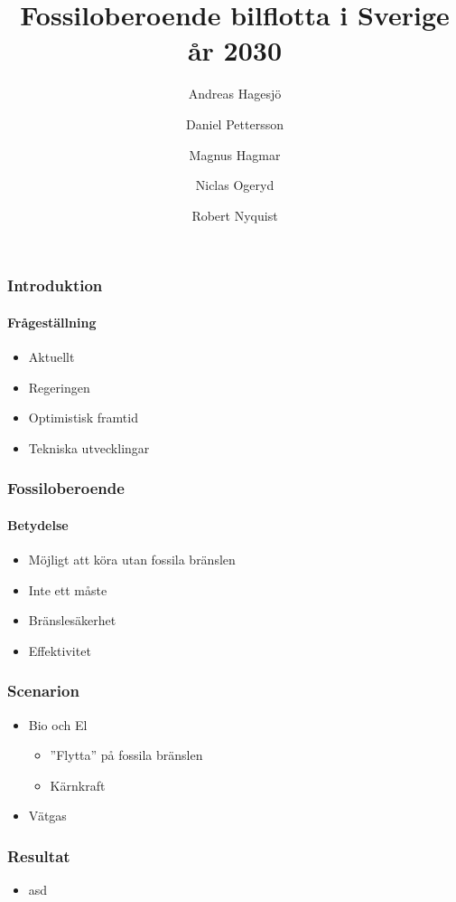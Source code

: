\documentclass{beamer}
\title{Fossiloberoende bilflotta i Sverige år 2030}
\author[Andreas \and Daniel \and Magnus \and Niclas \and Robert]{Andreas Hagesjö \and Daniel Pettersson \and
Magnus Hagmar \and Niclas Ogeryd \and Robert Nyquist}
\begin{document}
\frame{\titlepage}

\begin{frame}
	\frametitle{Introduktion}
	\framesubtitle{Frågeställning}
	\begin{itemize}
		\item Aktuellt
		\item Regeringen
		\item Optimistisk framtid
		\item Tekniska utvecklingar
	\end{itemize}
\end{frame}

\begin{frame}
	\frametitle{Fossiloberoende}
	\framesubtitle{Betydelse}
	\begin{itemize}
		\item Möjligt att köra utan fossila bränslen
		\item Inte ett måste
		\item Bränslesäkerhet
		\item Effektivitet
	\end{itemize}
\end{frame}

\begin{frame}
	\frametitle{Scenarion}
	\begin{itemize}
		\item Bio och El
			\begin{itemize}
				\item ''Flytta'' på fossila bränslen
				\item Kärnkraft
			\end{itemize}
		\item Vätgas
	\end{itemize}
\end{frame}

\begin{frame}
	\frametitle{Resultat}
	\pause
	\begin{itemize}[<+->]
		\item asd
	\end{itemize}
\end{frame}
\end{document}
